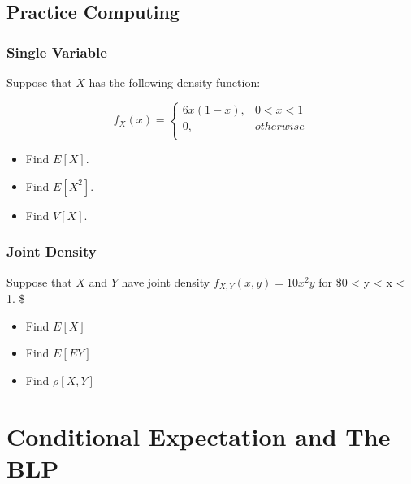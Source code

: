 \documentclass[
]{book}
\providecommand{\tightlist}{%
  \setlength{\itemsep}{0pt}\setlength{\parskip}{0pt}}
\theoremstyle{definition}
\theoremstyle{definition}
\theoremstyle{definition}
\theoremstyle{definition}
\theoremstyle{remark}
\begin{document}
\hypertarget{practice-computing}{%
\section{Practice Computing}\label{practice-computing}}

\hypertarget{single-variable}{%
\subsection{Single Variable}\label{single-variable}}

Suppose that \(X\) has the following density function:

\[ 
  f_{X}(x) = \begin{cases} 
    6x(1 - x), & 0 < x < 1 \\ 
    0, & otherwise \\ 
  \end{cases}
\]

\begin{itemize}
\tightlist
\item
  Find \(E[X]\).
\item
  Find \(E[X^2]\).
\item
  Find \(V[X]\).
\end{itemize}

\hypertarget{joint-density-1}{%
\subsection{Joint Density}\label{joint-density-1}}

Suppose that \(X\) and \(Y\) have joint density \(f_{X,Y}(x,y) = 10 x^2y\) for \$0 \textless{} y \textless{} x \textless{} 1. \$

\begin{itemize}
\tightlist
\item
  Find \(E[X]\)
\item
  Find \(E[EY]\)
\item
  Find \(\rho[X,Y]\)
\end{itemize}

\hypertarget{conditional-expectation-and-the-blp}{%
\chapter{Conditional Expectation and The BLP}\label{conditional-expectation-and-the-blp}}
\end{document}
